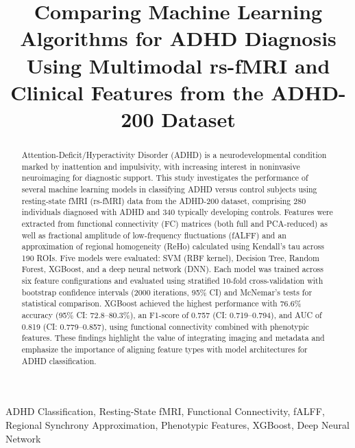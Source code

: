 \documentclass[conference]{IEEEtran}
\begin{document}
\title{Comparing Machine Learning Algorithms for ADHD Diagnosis Using Multimodal rs-fMRI and Clinical Features from the ADHD-200 Dataset}

\author{
}

\maketitle

\begin{abstract}
Attention-Deficit/Hyperactivity Disorder (ADHD) is a neurodevelopmental condition marked by inattention and impulsivity, with increasing interest in noninvasive neuroimaging for diagnostic support. This study investigates the performance of several machine learning models in classifying ADHD versus control subjects using resting-state fMRI (rs-fMRI) data from the ADHD-200 dataset, comprising 280 individuals diagnosed with ADHD and 340 typically developing controls. Features were extracted from functional connectivity (FC) matrices (both full and PCA-reduced) as well as fractional amplitude of low-frequency fluctuations (fALFF) and an approximation of regional homogeneity (ReHo) calculated using Kendall's tau across 190 ROIs. Five models were evaluated: SVM (RBF kernel), Decision Tree, Random Forest, XGBoost, and a deep neural network (DNN). Each model was trained across six feature configurations and evaluated using stratified 10-fold cross-validation with bootstrap confidence intervals (2000 iterations, 95\% CI) and McNemar's tests for statistical comparison. XGBoost achieved the highest performance with 76.6\% accuracy (95\% CI: 72.8--80.3\%), an F1-score of 0.757 (CI: 0.719--0.794), and AUC of 0.819 (CI: 0.779--0.857), using functional connectivity combined with phenotypic features. These findings highlight the value of integrating imaging and metadata and emphasize the importance of aligning feature types with model architectures for ADHD classification.
\end{abstract}

\begin{IEEEkeywords}
ADHD Classification, Resting-State fMRI, Functional Connectivity, fALFF, Regional Synchrony Approximation, Phenotypic Features, XGBoost, Deep Neural Network
\end{IEEEkeywords}
\end{document}
